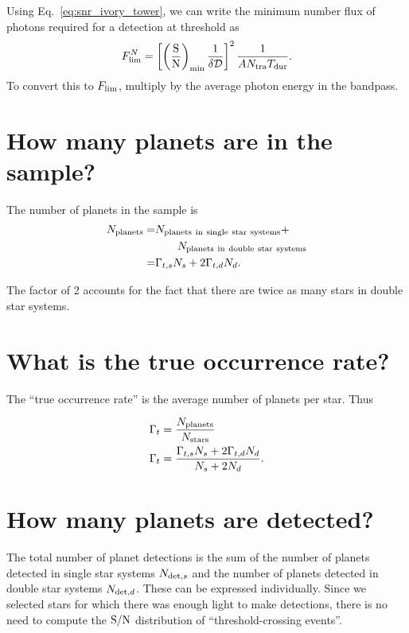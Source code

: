 \documentclass{emulateapj}
\begin{document}
Using Eq.~\ref{eq:snr_ivory_tower}, we can write the minimum number flux of 
photons required for a detection at threshold as
\begin{equation}
F_{\rm lim}^N = \left[ \left({\rm \frac{S}{N}}\right)_{\rm min} \frac{1}{\delta 
\mathcal{D}} \right]^2 \frac{1}{A N_{\rm tra} T_{\rm dur}}.
\end{equation}
To convert this to $F_{\rm lim}$, multiply by the average photon energy in the 
bandpass.



\section{How many planets are in the sample?}

The number of planets in the sample is
\begin{align}
N_{\rm planets} =& N_{\rm planets\ in\ single\ star\ systems}  +  \\
				  &\quad\quad N_{\rm planets\ in\ double\ star\ systems} 
				  \nonumber \\
			   =& \Gamma_{t,s} N_s + 2 \Gamma_{t,d} N_d.
\end{align}

The factor of 2 accounts for the fact that there are twice as many stars in 
double star systems.



\section{What is the true occurrence rate?}
\label{sec:true_rate}

The ``true occurrence rate'' is the average number of planets per star. Thus

\begin{align}
\Gamma_t &= \frac{N_{\rm planets}}{N_{\rm stars}} \\
\Gamma_t &= \frac{\Gamma_{t,s} N_s + 2 \Gamma_{t,d} N_d}{N_s + 2N_d}.
\label{eq:true_occ}
\end{align}



\section{How many planets are detected?}
The total number of planet detections is the sum of the number of planets 
detected in single star systems $N_{{\rm det},s}$ and the number of planets 
detected in double star systems $N_{{\rm det},d}$.
These can be expressed individually. 
Since we selected stars for which there was enough light to make detections, 
there is no need to compute the ${\rm S/N}$ distribution of 
``threshold-crossing events''.
\end{document}
